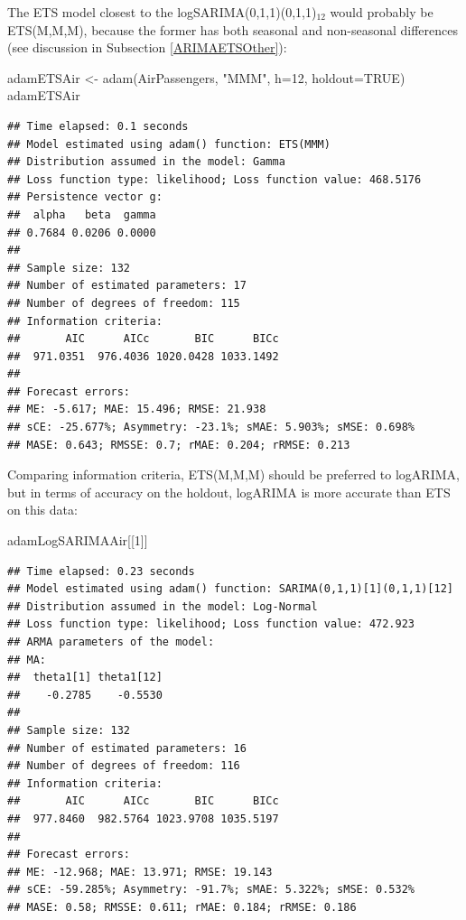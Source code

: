 \documentclass[
]{book}
\newenvironment{Shaded}{\begin{snugshade}}{\end{snugshade}}
\newcommand{\AttributeTok}[1]{\textcolor[rgb]{0.77,0.63,0.00}{#1}}
\newcommand{\ConstantTok}[1]{\textcolor[rgb]{0.00,0.00,0.00}{#1}}
\newcommand{\DecValTok}[1]{\textcolor[rgb]{0.00,0.00,0.81}{#1}}
\newcommand{\FunctionTok}[1]{\textcolor[rgb]{0.00,0.00,0.00}{#1}}
\newcommand{\NormalTok}[1]{#1}
\newcommand{\OtherTok}[1]{\textcolor[rgb]{0.56,0.35,0.01}{#1}}
\newcommand{\StringTok}[1]{\textcolor[rgb]{0.31,0.60,0.02}{#1}}
\theoremstyle{definition}
\theoremstyle{definition}
\theoremstyle{definition}
\theoremstyle{definition}
\theoremstyle{remark}
\begin{document}
The ETS model closest to the logSARIMA(0,1,1)(0,1,1)\(_{12}\) would probably be ETS(M,M,M), because the former has both seasonal and non-seasonal differences (see discussion in Subsection \ref{ARIMAETSOther}):

\begin{Shaded}
\begin{Highlighting}[]
\NormalTok{adamETSAir }\OtherTok{\textless{}{-}} \FunctionTok{adam}\NormalTok{(AirPassengers, }\StringTok{"MMM"}\NormalTok{, }\AttributeTok{h=}\DecValTok{12}\NormalTok{, }\AttributeTok{holdout=}\ConstantTok{TRUE}\NormalTok{)}
\NormalTok{adamETSAir}
\end{Highlighting}
\end{Shaded}

\begin{verbatim}
## Time elapsed: 0.1 seconds
## Model estimated using adam() function: ETS(MMM)
## Distribution assumed in the model: Gamma
## Loss function type: likelihood; Loss function value: 468.5176
## Persistence vector g:
##  alpha   beta  gamma 
## 0.7684 0.0206 0.0000 
## 
## Sample size: 132
## Number of estimated parameters: 17
## Number of degrees of freedom: 115
## Information criteria:
##       AIC      AICc       BIC      BICc 
##  971.0351  976.4036 1020.0428 1033.1492 
## 
## Forecast errors:
## ME: -5.617; MAE: 15.496; RMSE: 21.938
## sCE: -25.677%; Asymmetry: -23.1%; sMAE: 5.903%; sMSE: 0.698%
## MASE: 0.643; RMSSE: 0.7; rMAE: 0.204; rRMSE: 0.213
\end{verbatim}

Comparing information criteria, ETS(M,M,M) should be preferred to logARIMA, but in terms of accuracy on the holdout, logARIMA is more accurate than ETS on this data:

\begin{Shaded}
\begin{Highlighting}[]
\NormalTok{adamLogSARIMAAir[[}\DecValTok{1}\NormalTok{]]}
\end{Highlighting}
\end{Shaded}

\begin{verbatim}
## Time elapsed: 0.23 seconds
## Model estimated using adam() function: SARIMA(0,1,1)[1](0,1,1)[12]
## Distribution assumed in the model: Log-Normal
## Loss function type: likelihood; Loss function value: 472.923
## ARMA parameters of the model:
## MA:
##  theta1[1] theta1[12] 
##    -0.2785    -0.5530 
## 
## Sample size: 132
## Number of estimated parameters: 16
## Number of degrees of freedom: 116
## Information criteria:
##       AIC      AICc       BIC      BICc 
##  977.8460  982.5764 1023.9708 1035.5197 
## 
## Forecast errors:
## ME: -12.968; MAE: 13.971; RMSE: 19.143
## sCE: -59.285%; Asymmetry: -91.7%; sMAE: 5.322%; sMSE: 0.532%
## MASE: 0.58; RMSSE: 0.611; rMAE: 0.184; rRMSE: 0.186
\end{verbatim}
\end{document}
